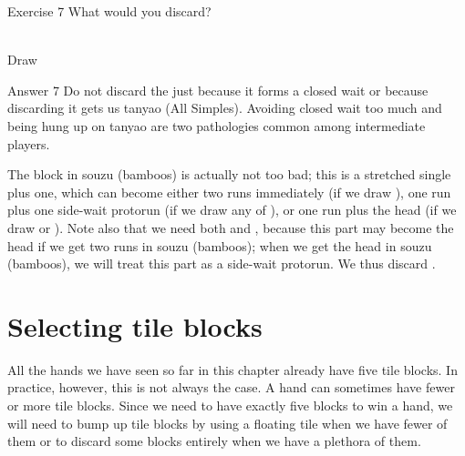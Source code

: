 \vfill

\begin{itembox}[l]{Exercise 7}
What would you discard? 
\vspace{-10pt}

\bp
{}~\\
\hfill\footnotesize{Draw~~~~~~~~~~~}
\ep
\end{itembox}

\newpage


\begin{itembox}[r]{Answer 7}
\emj
Do not discard the {\LARGE{}} just because it forms a closed wait or because discarding it gets us {\jap tanyao} (All Simples). Avoiding closed wait too much and being hung up on {\jap tanyao} are two pathologies common among intermediate players. 
\bigskip

The block in {\jap souzu} (bamboos) is actually not too bad; this is a stretched single plus one, which can become either two runs immediately (if we draw {\LARGE{}}), one run plus one side-wait protorun (if we draw any of {\LARGE{}}), or one run plus the head (if we draw {\LARGE{}} or {\LARGE{}}). Note also that we need both {\LARGE{}} and {\LARGE{}}, because this part may become the head if we get two runs in {\jap souzu} (bamboos); when we get the head in {\jap souzu} (bamboos), we will treat this part as a side-wait protorun. We thus discard {\LARGE{}}. 
\end{itembox}


\newpage

\section{Selecting tile blocks}
All the hands we have seen so far in this chapter already have five tile blocks. In practice, however, this is not always the case. A hand can sometimes have fewer or more tile blocks. Since we need to have exactly five blocks to win a hand, we will need to bump up tile blocks by using a floating tile when we have fewer of them or to discard some blocks entirely when we have a plethora of them. 

